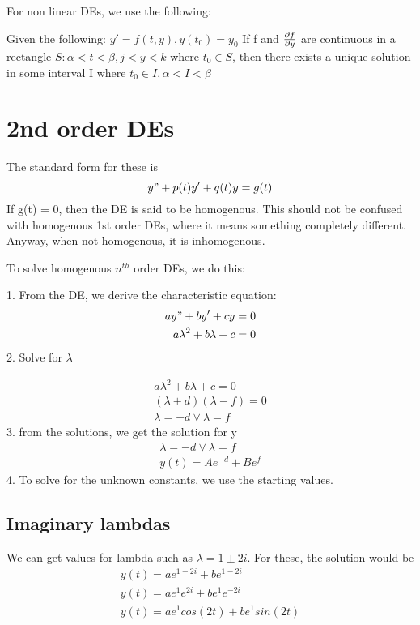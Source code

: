 \documentclass[17pt]{extarticle} %
\begin{document}
For non linear DEs, we use the following:
\begin{theorem}
    Given the following: $y' = f(t, y), y(t_0) = y_0$
    If f and ${\partial f \over \partial y}$ are continuous in a rectangle $S : \alpha < t < \beta , j < y < k $ where 
    $t_0 \in S$, then there exists a unique solution in some interval I where $t_0 \in I, \alpha < I < \beta$

\end{theorem}
\newpage
\section{2nd order DEs}
The standard form for these is 
$$
y" + p(t)y' + q(t) y = g(t)
$$
If g(t) = 0, then the DE is said to be homogenous. This should not be confused with homogenous 1st order DEs, where it means something completely different.
Anyway, when not homogenous, it is inhomogenous.

To solve homogenous $n^{th}$ order DEs, we do this:

1. From the DE, we derive the characteristic equation:
 $$
 \begin{aligned}
    ay" + by' + c y = 0 \\
    a \lambda^2 + b \lambda + c = 0 \\  
 \end{aligned}
 $$
2. Solve for $\lambda$ 

$$
\begin{aligned}
    a \lambda^2 + b \lambda + c = 0 \\
    (\lambda + d) (\lambda - f) = 0\\
    \lambda = -d \lor \lambda = f
\end{aligned}
$$
3. from the solutions, we get the solution for y
$$
\begin{aligned}
    \lambda = -d \lor \lambda = f \\
    y(t) = A e^{-d} + B e^{f} 
\end{aligned}
$$
4. To solve for the unknown constants, we use the starting values.

\subsection{Imaginary lambdas}
We can get values for lambda such as $\lambda = 1 \pm 2 i$. 
For these, the solution would be 
$$
\begin{aligned}
    y(t) = a e^{1+ 2i} + b e^{1-2i} \\
    y(t) = a e^1 e^{2i} + b e^1 e^{-2i} \\
    y(t) = a e^1 cos(2t) + b e^1 sin(2t)
\end{aligned}
$$
\end{document}
